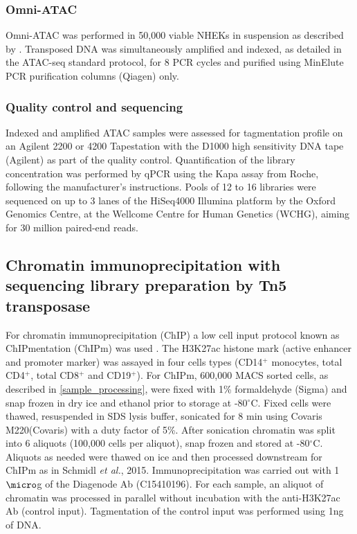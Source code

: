\subsubsection{Omni-ATAC}
Omni-ATAC was performed in 50,000 viable NHEKs in suspension as described by \parencite{Corces2017}. Transposed DNA was simultaneously amplified and indexed, as detailed in the ATAC-seq standard protocol, for 8 PCR cycles and purified using MinElute PCR purification columns (Qiagen) only. 


\subsubsection{Quality control and sequencing}
Indexed and amplified ATAC samples were assessed for tagmentation profile on an Agilent 2200 or 4200 Tapestation with the D1000 high sensitivity DNA tape (Agilent) as part of the quality control. Quantification of the library concentration was performed by qPCR using the Kapa assay from Roche, following the manufacturer's instructions. Pools of 12 to 16 libraries were sequenced on up to 3 lanes of the HiSeq4000 Illumina platform by the Oxford Genomics Centre, at the Wellcome Centre for Human Genetics (WCHG), aiming for 30 million paired-end reads.

\subsection{Chromatin immunoprecipitation with sequencing library preparation by Tn5 transposase}
For chromatin immunoprecipitation (ChIP) a low cell input protocol known as ChIPmentation (ChIPm) was used \parencite{Schmidl2015}. The H3K27ac histone mark (active enhancer and promoter marker) was assayed in four cells types (CD14$^+$ monocytes, total CD4$^+$, total CD8$^+$ and CD19$^+$). For ChIPm, 600,000 MACS sorted cells, as described in \ref{sample_processing}, were fixed with 1\% formaldehyde (Sigma) and snap frozen in dry ice and ethanol prior to storage at -80{$^\circ$}C. Fixed cells were thawed, resuspended in SDS lysis buffer, sonicated for 8 min using Covaris M220(Covaris) with a duty factor of 5\%. After sonication chromatin was split into 6 aliquots (100,000 cells per aliquot), snap frozen and stored at -80{$^\circ$}C. Aliquots as needed were thawed on ice and then processed downstream for ChIPm as in Schmidl \textit{et al.}, 2015. Immunoprecipitation was carried out with 1$\micro$g of the Diagenode Ab (C15410196). For each sample, an aliquot of chromatin was processed in parallel without incubation with the anti-H3K27ac Ab (control input). Tagmentation of the control input was performed using 1ng of DNA.

